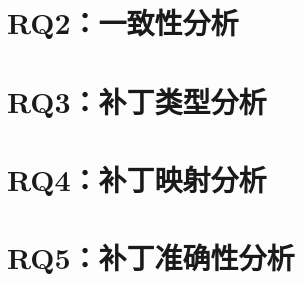 \section{RQ2：一致性分析}\label{sec:consistency}

\section{RQ3：补丁类型分析}\label{sec:type}

\section{RQ4：补丁映射分析}\label{sec:cardinality}

\section{RQ5：补丁准确性分析}\label{sec:accuracy}
